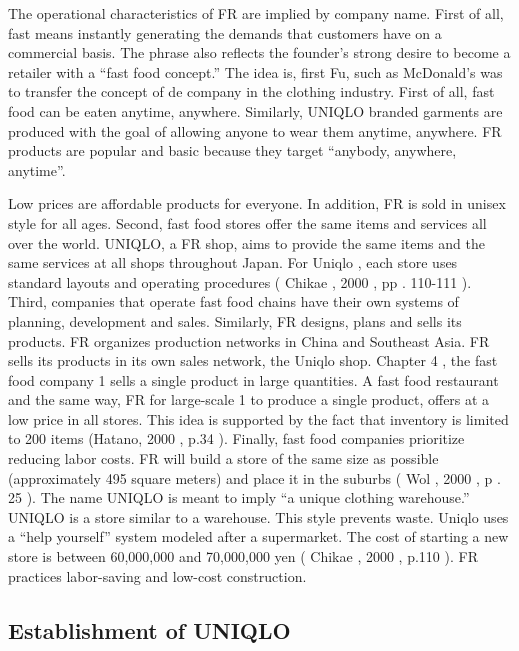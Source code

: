 \documentclass[]{article}
\begin{document}
The operational characteristics of FR are implied by company name. First
of all, fast means instantly generating the demands that customers have
on a commercial basis. The phrase also reflects the founder's strong
desire to become a retailer with a ``fast food concept.'' The idea is,
first Fu, such as McDonald's was to transfer the concept of de company
in the clothing industry. First of all, fast food can be eaten anytime,
anywhere. Similarly, UNIQLO branded garments are produced with the goal
of allowing anyone to wear them anytime, anywhere. FR products are
popular and basic because they target ``anybody, anywhere, anytime''.

Low prices are affordable products for everyone. In addition, FR is sold
in unisex style for all ages. Second, fast food stores offer the same
items and services all over the world. UNIQLO, a FR shop, aims to
provide the same items and the same services at all shops throughout
Japan. For Uniqlo , each store uses standard layouts and operating
procedures ( Chikae , 2000 , pp . 110-111 ). Third, companies that
operate fast food chains have their own systems of planning, development
and sales. Similarly, FR designs, plans and sells its products. FR
organizes production networks in China and Southeast Asia. FR sells its
products in its own sales network, the Uniqlo shop. Chapter 4 , the fast
food company 1 sells a single product in large quantities. A fast food
restaurant and the same way, FR for large-scale 1 to produce a single
product, offers at a low price in all stores. This idea is supported by
the fact that inventory is limited to 200 items (Hatano, 2000 , p.34 ).
Finally, fast food companies prioritize reducing labor costs. FR will
build a store of the same size as possible (approximately 495 square
meters) and place it in the suburbs ( Wol , 2000 , p . 25 ). The name
UNIQLO is meant to imply ``a unique clothing warehouse.'' UNIQLO is a
store similar to a warehouse. This style prevents waste. Uniqlo uses a
``help yourself'' system modeled after a supermarket. The cost of
starting a new store is between 60,000,000 and 70,000,000 yen ( Chikae ,
2000 , p.110 ). FR practices labor-saving and low-cost construction.

\hypertarget{establishment-of-uniqlo}{%
\subsection{Establishment of UNIQLO}\label{establishment-of-uniqlo}}
\end{document}
